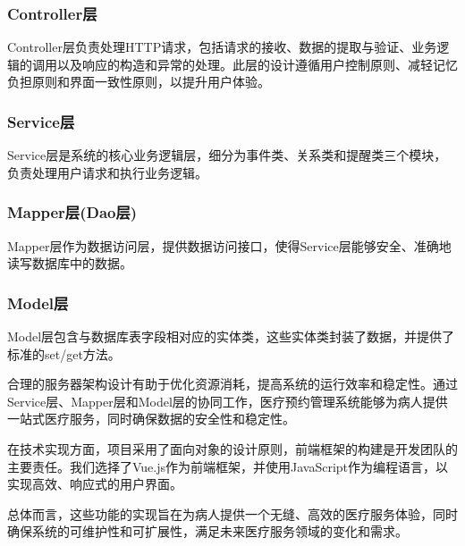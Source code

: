 \subsubsection{Controller层}
Controller层负责处理HTTP请求，包括请求的接收、数据的提取与验证、业务逻辑的调用以及响应的构造和异常的处理。此层的设计遵循用户控制原则、减轻记忆负担原则和界面一致性原则，以提升用户体验。

\subsubsection{Service层}
Service层是系统的核心业务逻辑层，细分为事件类、关系类和提醒类三个模块，负责处理用户请求和执行业务逻辑。

\subsubsection{Mapper层(Dao层)}
Mapper层作为数据访问层，提供数据访问接口，使得Service层能够安全、准确地读写数据库中的数据。

\subsubsection{Model层}
Model层包含与数据库表字段相对应的实体类，这些实体类封装了数据，并提供了标准的set/get方法。

合理的服务器架构设计有助于优化资源消耗，提高系统的运行效率和稳定性。通过Service层、Mapper层和Model层的协同工作，医疗预约管理系统能够为病人提供一站式医疗服务，同时确保数据的安全性和稳定性。

在技术实现方面，项目采用了面向对象的设计原则，前端框架的构建是开发团队的主要责任。我们选择了Vue.js作为前端框架，并使用JavaScript作为编程语言，以实现高效、响应式的用户界面。

总体而言，这些功能的实现旨在为病人提供一个无缝、高效的医疗服务体验，同时确保系统的可维护性和可扩展性，满足未来医疗服务领域的变化和需求。